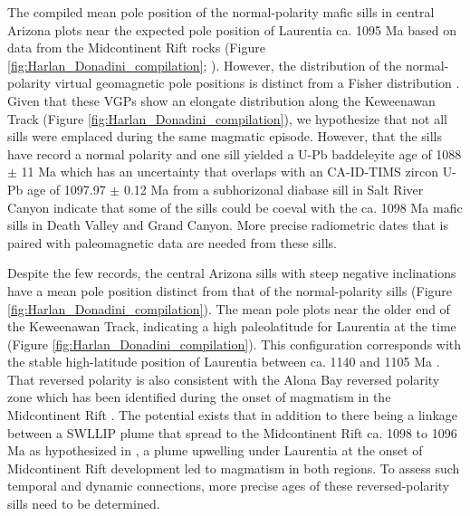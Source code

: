The compiled mean pole position of the normal-polarity mafic sills in central Arizona plots near the expected pole position of Laurentia ca. 1095 Ma based on data from the Midcontinent Rift rocks (Figure \ref{fig:Harlan_Donadini_compilation}; ). However, the distribution of the normal-polarity virtual geomagnetic pole positions is distinct from a Fisher distribution \cite{Fisher1953a}. Given that these VGPs show an elongate distribution along the Keweenawan Track (Figure \ref{fig:Harlan_Donadini_compilation}), we hypothesize that not all sills were emplaced during the same magmatic episode. However, that the sills have record a normal polarity and one sill yielded a U-Pb baddeleyite age of 1088 $\pm$ 11 Ma \cite{Bright2014a} which has an uncertainty that overlaps with an CA-ID-TIMS zircon U-Pb age of 1097.97 $\pm$ 0.12 Ma from a subhorizonal diabase sill in Salt River Canyon \cite{Mohr2024a} indicate that some of the sills could be coeval with the ca. 1098 Ma mafic sills in Death Valley and Grand Canyon. More precise radiometric dates that is paired with paleomagnetic data are needed from these sills. 

Despite the few records, the central Arizona sills with steep negative inclinations have a mean pole position distinct from that of the normal-polarity sills (Figure \ref{fig:Harlan_Donadini_compilation}). The mean pole plots near the older end of the Keweenawan Track, indicating a high paleolatitude for Laurentia at the time (Figure \ref{fig:Harlan_Donadini_compilation}). This configuration corresponds with the stable high-latitude position of Laurentia between ca. 1140 and 1105 Ma \cite{Ernst1993a, Piispa2018a, Swanson-Hysell2021c}. That reversed polarity is also consistent with the Alona Bay reversed polarity zone which has been identified during the onset of magmatism in the Midcontinent Rift \cite{Swanson-Hysell2019a}. The potential exists that in addition to there being a linkage between a SWLLIP plume that spread to the Midcontinent Rift ca. 1098 to 1096 Ma as hypothesized in , a plume upwelling under Laurentia at the onset of Midcontinent Rift development led to magmatism in both regions. To assess such temporal and dynamic connections, more precise ages of these reversed-polarity sills need to be determined. 

